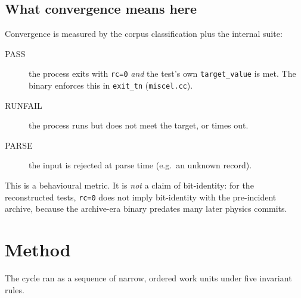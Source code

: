 \documentclass[11pt,a4paper]{report}
\newcommand{\code}[1]{\texttt{#1}}
\begin{document}
\section{What convergence means here}
\label{sec:convergence-def}

Convergence is measured by the corpus classification plus the internal suite:

\begin{description}
  \item[PASS] the process exits with \code{rc=0} \emph{and} the test's own
        \code{target\_\allowbreak value} is met. The binary enforces this in \code{exit\_\allowbreak tn}
        (\code{miscel.cc}).
  \item[RUNFAIL] the process runs but does not meet the target, or times out.
  \item[PARSE] the input is rejected at parse time (e.g.\ an unknown record).
\end{description}

This is a behavioural metric. It is \emph{not} a claim of bit-identity: for the
reconstructed tests, \code{rc=0} does not imply bit-identity with the
pre-incident archive, because the archive-era binary predates many later physics
commits.

\chapter{Method}
\label{ch:method}

The cycle ran as a sequence of narrow, ordered work units under five invariant
rules.
\end{document}
